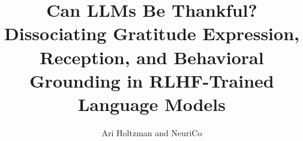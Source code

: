 \documentclass{article}
\title{Can LLMs Be Thankful? Dissociating Gratitude Expression, Reception, and Behavioral Grounding in RLHF-Trained Language Models}
\author{Ari Holtzman and NeuriCo}
\begin{document}
\maketitle

\begin{abstract}

\end{abstract}










\end{document}

